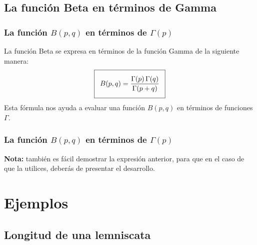 \documentclass[12pt]{beamer}
\begin{document}
\subsection{La función Beta en términos de Gamma}

\begin{frame}
\frametitle{La función $B(p, q)$ en términos de $\Gamma (p)$}
La función Beta se expresa en términos de la función Gamma de la siguiente manera:
\begin{align}
\addtolength{\fboxsep}{5pt}\boxed{B(p, q) = \dfrac{\Gamma(p) \, \Gamma(q)}{\Gamma (p + q)}}
\label{eq:ecuacion_07_01}
\end{align}
Esta fórmula nos ayuda a evaluar una función $B (p, q)$ en términos de funciones $\Gamma$. 
\end{frame}
\begin{frame}
\frametitle{La función $B(p, q)$ en términos de $\Gamma (p)$}
\textbf{Nota: } también es fácil demostrar la expresión anterior, para que en el caso de que la utilices, deberás de presentar el desarrollo.
\end{frame}

\section{Ejemplos}
\subsection{Longitud de una lemniscata}
\end{document}

